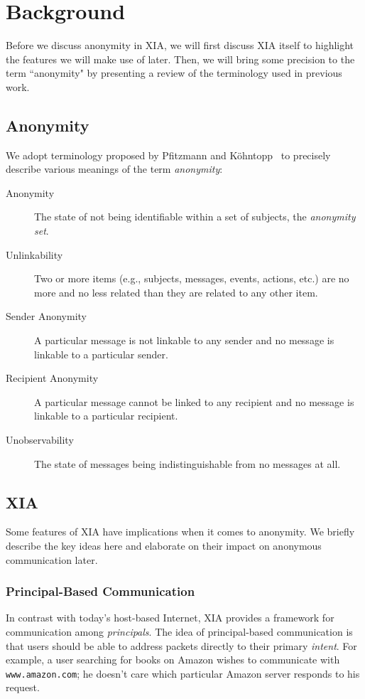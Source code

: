 \documentclass{article}
\begin{document}
\section{Background}
\label{background}
Before we discuss anonymity in XIA, we will first discuss XIA itself to highlight the features we will make use of later. Then, we will bring some precision to the term ``anonymity" by presenting a review of the terminology used in previous work.

\subsection{Anonymity}
We adopt terminology proposed by Pfitzmann and K\"{o}hntopp~\cite{terminology} to precisely describe various meanings of the term {\em anonymity}:
\begin{description}
\item[Anonymity] The state of not being identifiable within a set of subjects, the {\em anonymity set}.
\item[Unlinkability] Two or more items (e.g., subjects, messages, events, actions, etc.) are no more and no less related than they are related to any other item.
\item[Sender Anonymity] A particular message is not linkable to any sender and no message is linkable to a particular sender.
\item[Recipient Anonymity] A particular message cannot be linked to any recipient and no message is linkable to a particular recipient.
\item[Unobservability] The state of messages being indistinguishable from no messages at all.
\end{description}

\subsection{XIA}
Some features of XIA have implications when it comes to anonymity. We briefly describe the key ideas here and elaborate on their impact on anonymous communication later.
\subsubsection{Principal-Based Communication}
In contrast with today's host-based Internet, XIA provides a framework for communication among \emph{principals}. The idea of principal-based communication is that users should be able to address packets directly to their primary \emph{intent}. For example, a user searching for books on Amazon wishes to communicate with \texttt{www.amazon.com}; he doesn't care which particular Amazon server responds to his request.
\end{document}
